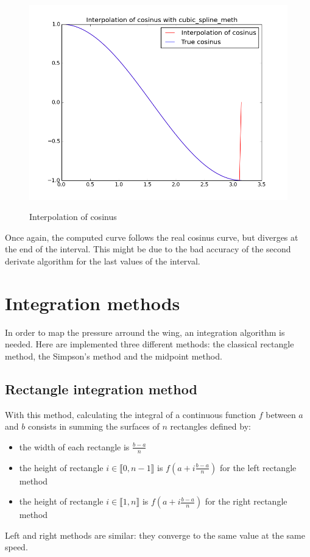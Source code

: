 \documentclass{article}
\begin{document}
\begin{figure}[h]
  \centering
  \caption{Interpolation of cosinus}
  \includegraphics[width=12cm]{cosinus_interpolation}
  \label{cosinus_interpolation}
\end{figure}

Once again, the computed curve follows the real cosinus curve, but diverges at the end of the interval. This might be due to the bad accuracy of the second derivate algorithm for the last values of the interval.

\section{Integration methods}
In order to map the pressure arround the wing, an integration algorithm is needed. Here are implemented three different methods: the classical rectangle method, the Simpson's method and the midpoint method.

\subsection{Rectangle integration method}
With this method, calculating the integral of a continuous function $f$ between $a$ and $b$ consists in summing the surfaces of $n$ rectangles defined by:
\begin{itemize}
\item the width of each rectangle is $\frac{b - a}{n}$
\item the height of rectangle $i \in \llbracket 0, n - 1 \rrbracket$ is $f(a + i\frac{b - a}{n})$ for the left rectangle method
\item the height of rectangle $i \in \llbracket 1, n \rrbracket$ is $f(a + i\frac{b - a}{n})$ for the right rectangle method
\end{itemize}
Left and right methods are similar: they converge to the same value at the same speed.
\end{document}
